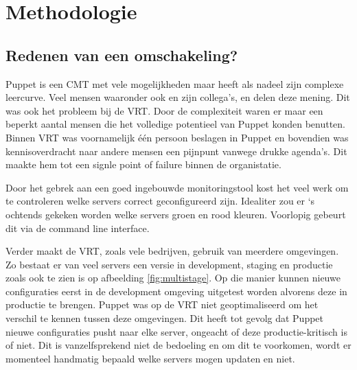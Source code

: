 
\chapter{Methodologie}
\label{ch:methodologie}


\section{Redenen van een omschakeling?}
\label{sec:methodologie-redenen-omschakeling}

Puppet is een CMT met vele mogelijkheden maar heeft als nadeel zijn complexe leercurve. Veel mensen waaronder ook \textcite{danAnsiblevsPuppet} en zijn collega's, \textcite{martinAnsiblevsPuppet} en \textcite{AliAnsiblevsPuppet} delen deze mening. Dit was ook het probleem bij de \gls{VRT}. Door de complexiteit waren er maar een beperkt aantal mensen die het volledige potentieel van Puppet konden benutten. Binnen \gls{VRT} was voornamelijk \'e\'en persoon beslagen in Puppet en bovendien was kennisoverdracht naar andere mensen een pijnpunt vanwege drukke agenda's. Dit maakte hem tot een signle point of failure binnen de organistatie.

Door het gebrek aan een goed ingebouwde monitoringstool kost het veel werk om te controleren welke servers correct geconfigureerd zijn. Idealiter zou er  `s ochtends gekeken worden welke servers groen en rood kleuren. Voorlopig gebeurt dit via de command line interface.  

Verder maakt de \gls{VRT}, zoals vele bedrijven, gebruik van meerdere omgevingen. Zo bestaat er van veel servers een versie in development, staging en productie zoals ook te zien is op afbeelding \ref{fig:multistage}. Op die manier kunnen nieuwe configuraties eerst in de development omgeving uitgetest worden alvorens deze in productie te brengen. Puppet was op de \gls{VRT} niet geoptimaliseerd om het verschil te kennen tussen deze omgevingen. Dit heeft tot gevolg dat Puppet nieuwe configuraties pusht naar elke server, ongeacht of deze productie-kritisch is of niet. Dit is vanzelfsprekend niet de bedoeling en om dit te voorkomen, wordt er momenteel handmatig bepaald welke servers mogen updaten en niet. 
 
